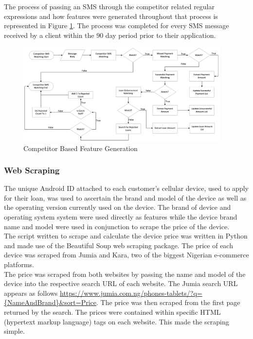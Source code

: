 The process of passing an SMS through the competitor related regular expressions and how features were generated throughout that process is represented in Figure \ref{fig:comp_features}. The process was completed for every SMS message received by a client within the 90 day period prior to their application. 

\vspace{10pt}

\begin{figure}[!htb]
\centering
\includegraphics[width=0.95\textwidth]{images/comp_feats.png}
\caption{Competitor Based Feature Generation}
\label{fig:comp_features}
\end{figure}

\vspace{10pt}


\subsubsection{Web Scraping}

The unique Android ID attached to each customer's cellular device, used to apply for their loan, was used to ascertain the brand and model of the device as well as the operating version currently used on the device. The brand of device and operating system system were used directly as features while the device brand name and model were used in conjunction to scrape the price of the device. \\

The script written to scrape and calculate the device price was written in Python and made use of the Beautiful Soup web scraping package. The price of each device was scraped from Jumia and Kara, two of the biggest Nigerian e-commerce platforms. \\

The price was scraped from both websites by passing the name and model of the device into the respective search URL of each website. The Jumia search URL appears as follows \url{https://www.jumia.com.ng/phones-tablets/?q={NameAndBrand}&sort=Price}. The price was then scraped from the first page returned by the search. The prices were contained within specific HTML (hypertext markup language) tags on each website. This made the scraping simple. \\

